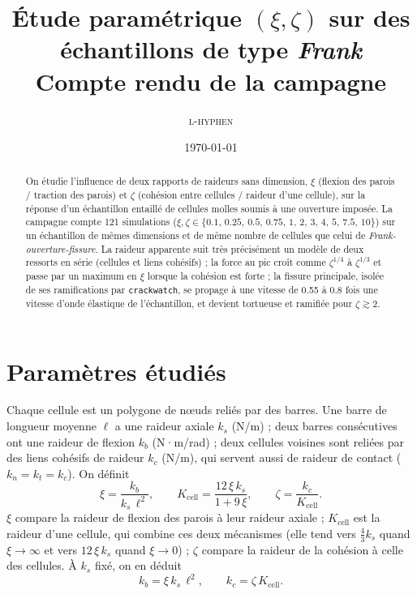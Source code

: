 \documentclass[11pt,a4paper]{article}
\title{Étude paramétrique $(\xi,\zeta)$ sur des échantillons de type \emph{Frank}\\[3pt]
  \large Compte rendu de la campagne \code{etude-param-frank}}
\author{\textsc{l-hyphen}}
\date{\today}
\newcommand{\code}[1]{\texttt{#1}}
\newcommand{\Kcell}{K_{\mathrm{cell}}}
\begin{document}
\maketitle

\begin{abstract}
  On étudie l'influence de deux rapports de raideurs sans dimension, $\xi$ (flexion des parois / traction des
  parois) et $\zeta$ (cohésion entre cellules / raideur d'une cellule), sur la réponse d'un échantillon entaillé de
  cellules molles soumis à une ouverture imposée. La campagne compte 121 simulations
  ($\xi,\zeta\in\{0.1,\,0.25,\,0.5,\,0.75,\,1,\,2,\,3,\,4,\,5,\,7.5,\,10\}$) sur un échantillon de mêmes
  dimensions et de même nombre de cellules que celui de \emph{Frank-ouverture-fissure}. La raideur apparente suit
  très précisément un modèle de deux ressorts en série (cellules et liens cohésifs) ; la force au pic croît
  comme $\zeta^{1/4}$ à $\zeta^{1/3}$ et passe par un maximum en $\xi$ lorsque la cohésion est forte ; la
  fissure principale, isolée de ses ramifications par \code{crackwatch}, se propage à une vitesse de 0.55 à 0.8
  fois une vitesse d'onde élastique de l'échantillon, et devient tortueuse et ramifiée pour $\zeta\gtrsim 2$.
\end{abstract}

\tableofcontents

\section{Paramètres étudiés}

Chaque cellule est un polygone de nœuds reliés par des barres. Une barre de longueur moyenne $\ell$ a une raideur
axiale $k_s$ (N/m) ; deux barres consécutives ont une raideur de flexion $k_b$ (N·m/rad) ; deux cellules voisines
sont reliées par des liens cohésifs de raideur $k_c$ (N/m), qui servent aussi de raideur de contact
($k_n=k_t=k_c$). On définit
\begin{equation}
  \xi = \frac{k_b}{k_s\,\ell^2},\qquad
  \Kcell = \frac{12\,\xi\,k_s}{1+9\,\xi},\qquad
  \zeta = \frac{k_c}{\Kcell}.
\end{equation}
$\xi$ compare la raideur de flexion des parois à leur raideur axiale ; $\Kcell$ est la raideur d'une cellule,
qui combine ces deux mécanismes (elle tend vers $\tfrac{4}{3}k_s$ quand $\xi\to\infty$ et vers $12\,\xi\,k_s$
quand $\xi\to 0$) ; $\zeta$ compare la raideur de la cohésion à celle des cellules. À $k_s$ fixé, on en déduit
\begin{equation}
  k_b = \xi\,k_s\,\ell^2,\qquad k_c = \zeta\,\Kcell .
\end{equation}
\end{document}
